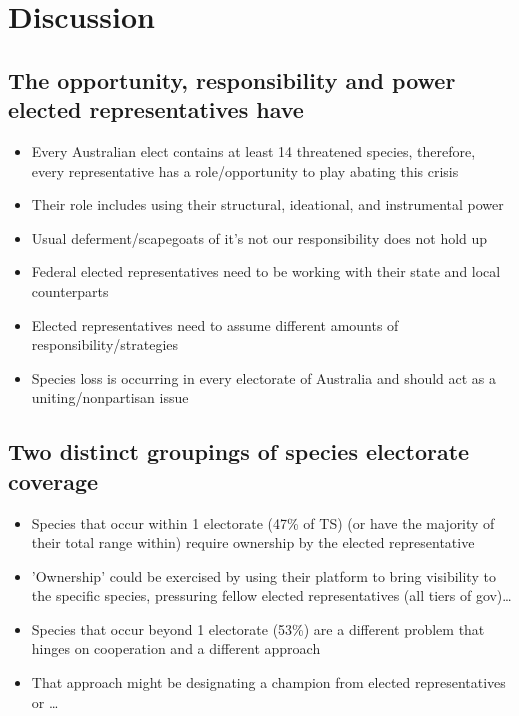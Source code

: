 \documentclass[a4paper,11pt]{article}
\begin{document}
\section{Discussion}

\subsection{The opportunity, responsibility and power elected representatives have}

\begin{itemize}
    \item Every Australian elect contains at least 14 threatened species, therefore, every representative has a role/opportunity to play abating this crisis
    \item Their role includes using their structural, ideational, and instrumental power
    \item Usual deferment/scapegoats of it's not our responsibility does not hold up
    \item Federal elected representatives need to be working with their state and local counterparts
    \item Elected representatives need to assume different amounts of responsibility/strategies
    \item Species loss is occurring in every electorate of Australia and should act as a uniting/nonpartisan issue
\end{itemize}

\subsection{Two distinct groupings of species electorate coverage}

\begin{itemize}
    \item Species that occur within 1 electorate (47\% of TS) (or have the majority of their total range within) require ownership by the elected representative
    \item 'Ownership' could be exercised by using their platform to bring visibility to the specific species, pressuring fellow elected representatives (all tiers of gov)\ldots
    \item Species that occur beyond 1 electorate (53\%) are a different problem that hinges on cooperation and a different approach
    \item That approach might be designating a champion from elected representatives or \ldots
\end{itemize}
\end{document}
